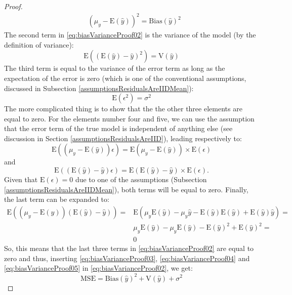 \documentclass[
]{book}
\theoremstyle{definition}
\theoremstyle{definition}
\theoremstyle{definition}
\theoremstyle{definition}
\theoremstyle{remark}
\begin{document}
\begin{proof}
\begin{equation}
\begin{aligned}
                                                            & (\mu_y -\mathrm{E}(\hat{y}))^2 = \mathrm{Bias}(\hat{y})^2
  \end{aligned}
    \label{eq:biasVarianceProof04}
\end{equation}
The second term in \eqref{eq:biasVarianceProof02} is the variance of the model (by the definition of variance):
\begin{equation}
    \mathrm{E}\left((\mathrm{E}(\hat{y}) -\hat{y})^2\right) = \mathrm{V}(\hat{y})
    \label{eq:biasVarianceProof05}
\end{equation}
The third term is equal to the variance of the error term as long as the expectation of the error is zero (which is one of the conventional assumptions, discussed in Subsection \ref{assumptionsResidualsAreIIDMean}):
\begin{equation}
    \mathrm{E}(\epsilon^2) = \sigma^2
    \label{eq:biasVarianceProof06}
\end{equation}
The more complicated thing is to show that the the other three elements are equal to zero. For the elements number four and five, we can use the assumption that the error term of the true model is independent of anything else (see discussion in Section \ref{assumptionsResidualsAreIID}), leading respectively to:
\begin{equation}
    \mathrm{E}\left((\mu_y -\mathrm{E}(\hat{y})) \epsilon \right) = \mathrm{E}(\mu_y -\mathrm{E}(\hat{y})) \times \mathrm{E}(\epsilon)
    \label{eq:biasVarianceProof07}
\end{equation}
and
\begin{equation}
    \mathrm{E}\left((\mathrm{E}(\hat{y}) -\hat{y}) \epsilon \right) = \mathrm{E}(\mathrm{E}(\hat{y})-\hat{y}) \times \mathrm{E}(\epsilon) .
    \label{eq:biasVarianceProof08}
\end{equation}
Given that \(\mathrm{E}(\epsilon)=0\) due to one of the assumptions (Subsection \ref{assumptionsResidualsAreIIDMean}), both terms will be equal to zero. Finally, the last term can be expanded to:
\begin{equation}
  \begin{aligned}
    \mathrm{E}\left((\mu_y -\mathrm{E}(\hat{y}))(\mathrm{E}(\hat{y}) -\hat{y}) \right) = & \mathrm{E}(\mu_y \mathrm{E}(\hat{y}) -\mu_y \hat{y} -\mathrm{E}(\hat{y})\mathrm{E}(\hat{y}) +\mathrm{E}(\hat{y})\hat{y}) = \\
      & \mu_y \mathrm{E}(\hat{y}) -\mu_y \mathrm{E}(\hat{y}) -\mathrm{E}(\hat{y})^2 +\mathrm{E}(\hat{y})^2 = \\
      & 0
  \end{aligned}
    \label{eq:biasVarianceProof09}
\end{equation}
So, this means that the last three terms in \eqref{eq:biasVarianceProof02} are equal to zero and thus, inserting \eqref{eq:biasVarianceProof03}, \eqref{eq:biasVarianceProof04} and \eqref{eq:biasVarianceProof05} in \eqref{eq:biasVarianceProof02}, we get:
\begin{equation*}
    \mathrm{MSE} = \mathrm{Bias}(\hat{y})^2 + \mathrm{V}(\hat{y}) + \sigma^2 
\end{equation*}
\end{proof}
\end{document}
